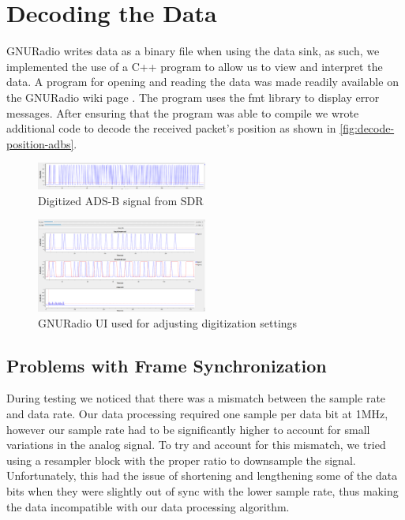 \documentclass[conference, onecolumn]{IEEEtran}
\begin{document}
\section{Decoding the Data}
GNURadio writes data as a binary file when using the data sink, as such, we implemented the use of a C++ program to allow us to view and interpret the data. A program for opening and reading the data was made readily available on the GNURadio wiki page \cite{gnuradio-reading-file-cpp}. The program uses the fmt library\cite{fmt-library} to display error messages. After ensuring that the program was able to compile we wrote additional code to decode the received packet's position as shown in \autoref{fig:decode-position-adbs}.

\begin{figure}
  \begin{center}
    \includegraphics[width=0.5\textwidth]{./figures/fig_ADSB_recv_digital.png}
  \end{center}
  \caption{Digitized ADS-B signal from SDR}\label{fig:digital}
\end{figure}

\begin{figure}
  \begin{center}
    \includegraphics[width=0.5\textwidth]{./figures/fig_gnuradio_fullUI.png}
  \end{center}
  \caption{GNURadio UI used for adjusting digitization settings}\label{fig:receive_UI}
\end{figure}

\subsection{Problems with Frame Synchronization}
During testing we noticed that there was a mismatch between the sample rate and data rate. Our data processing required one sample per data bit at 1MHz, however our sample rate had to be significantly higher to account for small variations in the analog signal. To try and account for this mismatch, we tried using a resampler block with the proper ratio to downsample the signal. Unfortunately, this had the issue of shortening and lengthening some of the data bits when they were slightly out of sync with the lower sample rate, thus making the data incompatible with our data processing algorithm.
\end{document}
